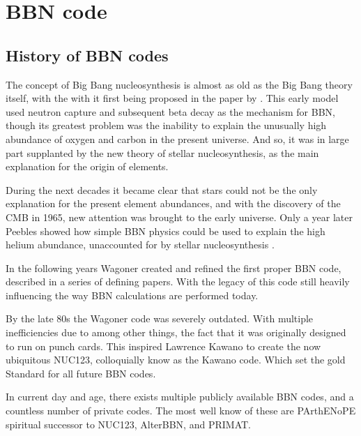 
\chapter{BBN code}
\label{chap:BBNcode}

\section{History of BBN codes}
\label{sec:BBN_history}

The concept of Big Bang nucleosynthesis is almost as old as the Big Bang theory itself, with the with it first being proposed in the paper by \textcite{Gamov48}. This early model used neutron capture and subsequent beta decay as the mechanism for BBN, though its greatest problem was the inability to explain the unusually high abundance of oxygen and carbon in the present universe. And so, it was in large part supplanted by the new theory of stellar nucleosynthesis, as the main explanation for the origin of elements. 

During the next decades it became clear that stars could not be the only explanation for the present element abundances, and with the discovery of the CMB in 1965, new attention was brought to the early universe. 
Only a year later Peebles showed how simple BBN physics could be used to explain the high helium abundance, unaccounted for by stellar nucleosynthesis \cite{Peebles66}.

In the following years Wagoner created and refined the first proper BBN code, described in a series of defining papers\cite{Wagoner67}\cite{Wagoner69}\cite{Wagoner72}. With the legacy of this code still heavily influencing the way BBN calculations are performed today.

By the late 80s the Wagoner code was severely outdated. With multiple inefficiencies due to among other things, the fact that it was originally designed to run on punch cards. This inspired Lawrence Kawano to create the now ubiquitous NUC123, colloquially know as the Kawano code. Which set the gold Standard for all future BBN codes. 

In current day and age, there exists multiple publicly available BBN codes, and a countless number of private codes. The most well know of these are PArthENoPE spiritual successor to NUC123, AlterBBN, and PRIMAT.


